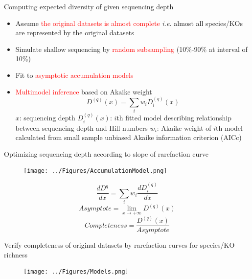 \documentclass{beamer}
\begin{document}
\begin{frame}{Computing expected diversity of given sequencing depth}
    \begin{itemize}
        \item Assume \textcolor{red}{the original datasets is almost complete}
        \newline \textit{i.e.} almost all species/KOs are represented by the original datasets
        \item Simulate shallow sequencing by \textcolor{red}{random subsampling} (10\%-90\% at interval of 10\%)
        \item Fit to \textcolor{red}{asymptotic accumulation models}
        \item \textcolor{red}{Multimodel inference} based on Akaike weight
        \newline 
        \begin{equation}
            D^{(q)}(x) = \sum_{i}w_iD^{(q)}_i(x)
        \end{equation}
        $x$: sequencing depth
        \newline
        $D^{(q)}_i(x)$: $i$th fitted model describing relationship between sequencing depth and Hill numbers
        \newline
        $w_i$: Akaike weight of $i$th model calculated from small sample unbiased Akaike information criterion (AICc)
    \end{itemize}    
\end{frame}

\begin{frame}{Optimizing sequencing depth according to slope of rarefaction curve}
    \begin{figure}
        \texttt{[image: ../Figures/AccumulationModel.png]}
    \end{figure}
    \begin{equation}
        \frac{dD^{q}}{dx} = \sum_{i}w_i\frac{dD^{(q)}_i}{dx}
    \end{equation}
    \begin{equation}
        Asymptote = \lim_{x \to +\infty}D^{(q)}(x)
    \end{equation}
    \begin{equation}
        Completeness = \frac{D^{(q)}(x)}{Asymptote}
    \end{equation}
\end{frame}

\begin{frame}{Verify completeness of original datasets by rarefaction curves for species/KO richness}
    \begin{figure}
        \texttt{[image: ../Figures/Models.png]}
    \end{figure}
\end{frame}
\end{document}

